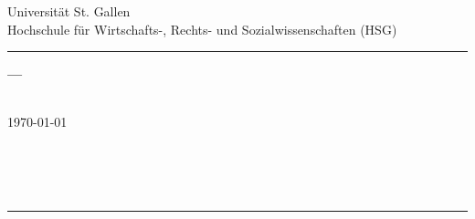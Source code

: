 \begin{center}
\Large{
Universität St. Gallen\\
Hochschule für Wirtschafts-, Rechts- und Sozialwissenschaften (HSG)
}
\vspace{.9cm}
\hrule
\vspace{2.8cm}
\Huge{\textsf{\textbf{
\theTitle
}}}
\vspace{.5cm}

\Large{\textsf{\textbf{---\\ \theSubtitle}}}\\
\vspace{2.8cm}

\Large{\today}\\
\vspace{.9cm}

\Large{
\theAuthor\\
\theAddress\\
\theZip~\theCity\\
\theMatriculation}
\vspace{2cm}
\hrule
\vspace{.9cm}
\Large{\theType\\
\theSupervisor\\
\theSemester}
\end{center}
\thispagestyle{empty}
